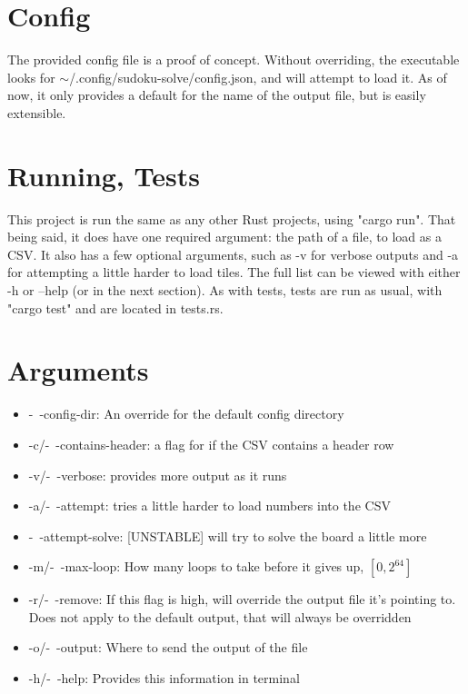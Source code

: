 \documentclass[11pt]{article}
\begin{document}
\section{Config}
The provided config file is a proof of concept. Without overriding, the executable looks for $\sim$/.config/sudoku-solve/config.json, and will attempt to load it. As of now, it only
provides a default for the name of the output file, but is easily extensible.

\section{Running, Tests}
This project is run the same as any other Rust projects, using "cargo run". That being said, it does have one required argument: the path of a file, to load as a CSV.
It also has a few optional arguments, such as -v for verbose outputs and -a for attempting a little harder to load tiles. The full list can be 
viewed with either -h or --help (or in the next section). As with tests, tests are run as usual, with "cargo test" and are located in tests.rs.

\section{Arguments}
\begin{itemize}
  \item -\ -config-dir: An override for the default config directory
  \item -c/-\ -contains-header: a flag for if the CSV contains a header row
  \item -v/-\ -verbose: provides more output as it runs
  \item -a/-\ -attempt: tries a little harder to load numbers into the CSV
  \item -\ -attempt-solve: [UNSTABLE] will try to solve the board a little more
  \item -m/-\ -max-loop: How many loops to take before it gives up, $[0, 2^{64}]$
  \item -r/-\ -remove: If this flag is high, will override the output file it's pointing to. Does not apply to the default output, that will always be overridden
  \item -o/-\ -output: Where to send the output of the file
  \item -h/-\ -help: Provides this information in terminal
\end{itemize}
\end{document}
